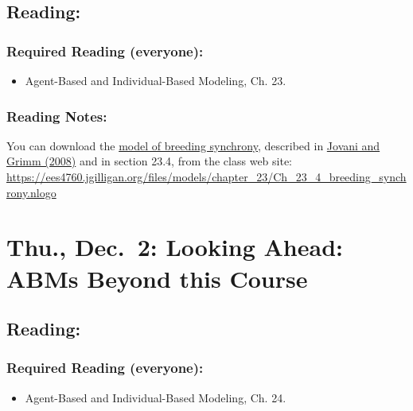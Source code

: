 \documentclass[
]{article}
\providecommand{\tightlist}{%
  \setlength{\itemsep}{0pt}\setlength{\parskip}{0pt}}
\begin{document}
\hypertarget{reading-24}{%
\subsection{Reading:}\label{reading-24}}

\hypertarget{required-reading-everyone-21}{%
\subsubsection{Required Reading
(everyone):}\label{required-reading-everyone-21}}

\begin{itemize}
\tightlist
\item
  Agent-Based and Individual-Based Modeling, Ch. 23.
\end{itemize}

\hypertarget{reading-notes-15}{%
\subsubsection{Reading Notes:}\label{reading-notes-15}}

You can download the
\href{/files/models/chapter_23/Ch_23_4_breeding_synchrony.nlogo}{model
of breeding synchrony}, described in
\href{/files/models/chapter_05/Jovani_Grimm_2008_Breeding.pdf}{Jovani
and Grimm (2008)} and in section 23.4, from the class web site:
\url{https://ees4760.jgilligan.org/files/models/chapter_23/Ch_23_4_breeding_synchrony.nlogo}

\hypertarget{thu.-dec.-2-looking-ahead-abms-beyond-this-course}{%
\section{Thu., Dec.~2: Looking Ahead: ABMs Beyond this
Course}\label{thu.-dec.-2-looking-ahead-abms-beyond-this-course}}

\hypertarget{reading-25}{%
\subsection{Reading:}\label{reading-25}}

\hypertarget{required-reading-everyone-22}{%
\subsubsection{Required Reading
(everyone):}\label{required-reading-everyone-22}}

\begin{itemize}
\tightlist
\item
  Agent-Based and Individual-Based Modeling, Ch. 24.
\end{itemize}
\end{document}
